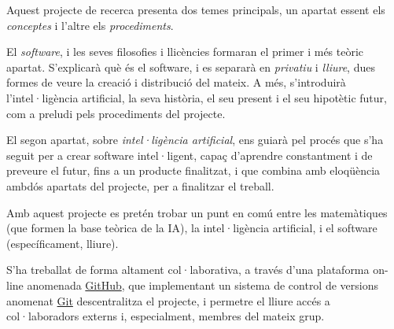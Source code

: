 Aquest projecte de recerca presenta dos temes principals, un apartat essent els
\emph{conceptes} i l'altre els \emph{procediments}.

El \emph{software}, i les seves filosofies i llicències formaran el primer i més
teòric apartat. S'explicarà què és el software, i es separarà en \emph{privatiu}
i \emph{lliure}, dues formes de veure la creació i distribució del mateix. A més,
s'introduirà l'intel·ligència artificial, la seva història, el seu present i el
seu hipotètic futur, com a preludi pels procediments del projecte.

El segon apartat, sobre \emph{intel·ligència artificial}, ens guiarà pel procés
que s'ha seguit per a crear software intel·ligent, capaç d'aprendre constantment
i de preveure el futur, fins a un producte finalitzat, i que combina amb eloqüència
ambdós apartats del projecte, per a finalitzar el treball.

Amb aquest projecte es pretén trobar un punt en comú entre les matemàtiques (que
formen la base teòrica de la IA), la intel·ligència artificial, i el software
(específicament, lliure).

S'ha treballat de forma altament col·laborativa, a través d'una plataforma
on-line anomenada \href{http://github.com}{GitHub}, que implementant un sistema
de control de versions anomenat \href{http://git-scm.com/}{Git} descentralitza
el projecte, i permetre el lliure accés a col·laboradors externs i, especialment, membres
del mateix grup.
